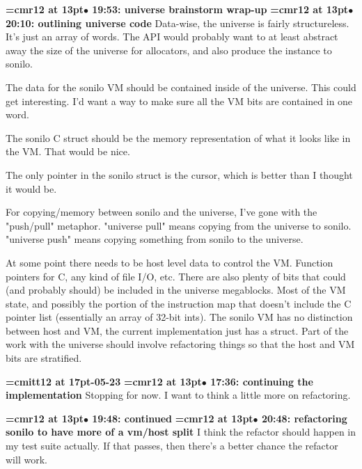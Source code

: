 {\smallskip\noindent\bf\font\titlefont=cmr12 at 13pt\titlefont $\bullet$ 19:53: universe brainstorm wrap-up}\smallskip
{\smallskip\noindent\bf\font\titlefont=cmr12 at 13pt\titlefont $\bullet$ 20:10: outlining universe code}\smallskip
Data-wise, the universe is fairly structureless. It's just an array of words. The API would probably want to at least abstract away the size of the universe for allocators, and also produce the instance to sonilo.
\par

The data for the sonilo VM should be contained inside of the universe. This could get interesting. I'd want a way to make sure all the VM bits are contained in one word.
\par

The sonilo C struct should be the memory representation of what it looks like in the VM. That would be nice.
\par

The only pointer in the sonilo struct is the cursor, which is better than I thought it would be.
\par

For copying/memory between sonilo and the universe, I've gone with the "push/pull" metaphor. "universe pull" means copying from the universe to sonilo. "universe push" means copying something from sonilo to the universe.
\par

At some point there needs to be host level data to control the VM. Function pointers for C, any kind of file I/O, etc. There are also plenty of bits that could (and probably should) be included in the universe megablocks. Most of the VM state, and possibly the portion of the instruction map that doesn't include the C pointer list (essentially an array of 32-bit ints). The sonilo VM has no distinction between host and VM, the current implementation just has a struct. Part of the work with the universe should involve refactoring things so that the host and VM bits are stratified.
\par

{\medskip\noindent\bf\font\titlefont=cmitt12 at 17pt-05-23}\medskip
{\smallskip\noindent\bf\font\titlefont=cmr12 at 13pt\titlefont $\bullet$ 17:36: continuing the implementation}\smallskip
Stopping for now. I want to think a little more on refactoring.
\par

{\smallskip\noindent\bf\font\titlefont=cmr12 at 13pt\titlefont $\bullet$ 19:48: continued}\smallskip
{\smallskip\noindent\bf\font\titlefont=cmr12 at 13pt\titlefont $\bullet$ 20:48: refactoring sonilo to have more of a vm/host split}\smallskip
I think the refactor should happen in my test suite actually. If that passes, then there's a better chance the refactor will work.
\par


